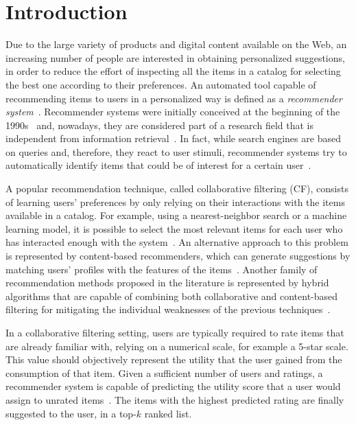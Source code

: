 \chapter{Introduction}

Due to the large variety of products and digital content available on the Web, an increasing number of people are interested in obtaining personalized suggestions, in order to reduce the effort of inspecting all the items in a catalog for selecting the best one according to their preferences. An automated tool capable of recommending items to users in a personalized way is defined as a \textit{recommender system}~\cite{Ricci2015}. Recommender systems were initially conceived at the beginning of the 1990s~\cite{Goldberg1992} and, nowadays, they are considered part of a research field that is independent from information retrieval~\cite{Herlocker2000}. In fact, while search engines are based on queries and, therefore, they react to user stimuli, recommender systems try to automatically identify items that could be of interest for a certain user~\cite{Balabanovic1997}.

A popular recommendation technique, called collaborative filtering (CF), consists of learning users' preferences by only relying on their interactions with the items available in a catalog. For example, using a nearest-neighbor search or a machine learning model, it is possible to select the most relevant items for each user who has interacted enough with the system~\cite{Su2009}. An alternative approach to this problem is represented by content-based recommenders, which can generate suggestions by matching users' profiles with the features of the items~\cite{Balabanovic1997,Basu1998}. Another family of recommendation methods proposed in the literature is represented by hybrid algorithms that are capable of combining both collaborative and content-based filtering for mitigating the individual weaknesses of the previous techniques~\cite{Stai2016}.

In a collaborative filtering setting, users are typically required to rate items that are already familiar with, relying on a numerical scale, for example a 5-star scale. This value should objectively represent the utility that the user gained from the consumption of that item. Given a sufficient number of users and ratings, a recommender system is capable of predicting the utility score that a user would assign to unrated items~\cite{Adomavicius2005}. The items with the highest predicted rating are finally suggested to the user, in a top-$k$ ranked list.


